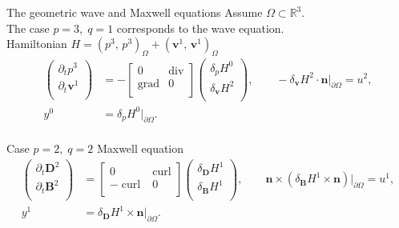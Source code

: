 \documentclass[aspectratio=169]{beamer}
\DeclareMathOperator*{\grad}{grad}
\renewcommand{\div}{\operatorname{div}}
\DeclareMathOperator*{\curl}{curl}
\newcommand{\bbR}{\mathbb{R}}
\newcommand{\inpr}[3][]{\ensuremath{( #2, \, #3 )_{#1}}}
\begin{document}
\begin{frame}{The geometric wave and Maxwell equations}
	Assume $\Omega \subset \bbR^3$. \\
	The case $p=3, \; q=1$ corresponds to the wave equation.\\
	Hamiltonian $H= \inpr[\Omega]{p^3}{p^3}+ \inpr[\Omega]{\bm{v}^1}{\bm{v}^1}$
	\begin{equation*}
			\begin{aligned}
				\begin{pmatrix}
					\partial_t p^3 \\
					\partial_t \bm{v}^1\\
				\end{pmatrix} &= 
				-\begin{bmatrix}
					0 & \div \\
					\grad & 0 \\
				\end{bmatrix}
				\begin{pmatrix}
					\delta_{p} H^{0}\\
					\delta_{\bm{v}} H^{2}\\
				\end{pmatrix}, \qquad -\delta_{\bm{v}} H^{2} \cdot \bm{n}|_{\partial\Omega}  = u^{2}, \\
				y^{0} &= \delta_{p} H^{0}|_{\partial\Omega}.
			\end{aligned}	
	\end{equation*}
	\vspace{.5cm}\\
	Case $p=2, \;q=2$ Maxwell equation
	\begin{equation*}
		\begin{aligned}
			\begin{pmatrix}
				\partial_t \bm{D}^2 \\
				\partial_t \bm{B}^2\\
			\end{pmatrix} &= 
			\begin{bmatrix}
				0 & \curl \\
				-\curl & 0 \\
			\end{bmatrix}
			\begin{pmatrix}
				\delta_{\bm{D}} H^{1}\\
				\delta_{\bm{B}} H^{1}\\
			\end{pmatrix}, \qquad \bm{n} \times (\delta_{\bm{B}} H^{1} \times \bm{n})|_{\partial\Omega} = u^{1}, \\
			y^{1} &= \delta_{\bm{D}} H^{1} \times \bm{n}|_{\partial\Omega}. 
		\end{aligned}	
	\end{equation*}
	
\end{frame}
\end{document}
